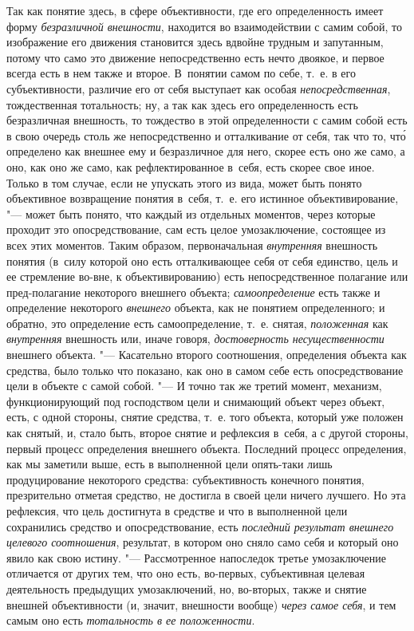 Так как понятие здесь, в сфере объективности, где его определенность
имеет форму {\em безразличной внешности},
находится во взаимодействии с самим собой, то изображение его
движения становится здесь вдвойне трудным и запутанным, потому что само это
движение непосредственно есть нечто двоякое, и первое всегда есть в нем
также и второе. В~понятии самом по себе, т.~е. в его субъективности,
различие его от себя выступает как особая {\em непосредственная},
тождественная тотальность; ну, а так как здесь его
определенность есть безразличная внешность, то тождество в этой
определенности с самим собой есть в свою очередь столь же непосредственно и
отталкивание от себя, так что то, чт\'{о} определено как внешнее ему и
безразличное для него, скорее есть оно же само, а оно, как оно же само, как
рефлектированное в~себя, есть скорее свое иное. Только в том случае, если
не упускать этого из вида, может быть понято объективное возвращение
понятия в~себя, т.~е. его истинное объективирование, "--- может
быть понято, что каждый из отдельных моментов, через которые проходит это
опосредствование, сам есть целое умозаключение, состоящее из всех этих
моментов. Таким образом, первоначальная
{\em внутренняя}
внешность понятия (в~силу которой оно есть отталкивающее себя
от себя единство, цель и ее стремление во-вне, к объективированию) есть
непосредственное полагание или пред-полагание некоторого внешнего объекта;
{\em самоопределение}
есть также и определение некоторого
{\em внешнего} объекта,
как не понятием определенного; и обратно, это определение есть
самоопределение, т.~е. снятая,
{\em положенная} как
{\em внутренняя}
внешность или, иначе говоря,
{\em достоверность несущественности}
внешнего объекта. "--- Касательно второго
соотношения, определения объекта как средства, было только что показано,
как оно в самом себе есть опосредствование цели в объекте с самой собой. "---
И точно так же третий момент, механизм, функционирующий под
господством цели и снимающий объект через объект, есть, с одной стороны,
снятие средства, т.~е. того объекта, который уже положен как снятый, и,
стало быть, второе снятие и рефлексия в~себя, а с другой стороны, первый
процесс определения внешнего объекта. Последний процесс определения, как мы
заметили выше, есть в выполненной цели опять-таки лишь
продуцирование некоторого средства: субъективность конечного понятия,
презрительно отметая средство, не достигла в своей цели ничего лучшего. Но
эта рефлексия, что цель достигнута в средстве и что в выполненной цели
сохранились средство и опосредствование, есть
{\em последний результат внешнего
целевого соотношения}, результат, в котором оно сняло само
себя и который оно явило как свою истину. "--- Рассмотренное
напоследок третье умозаключение отличается от других тем, что оно есть,
во-первых, субъективная целевая деятельность предыдущих умозаключений, но,
во-вторых, также и снятие внешней объективности (и, значит, внешности
вообще) {\em через самое себя},
и тем самым оно есть
{\em тотальность в ее положенности}.

